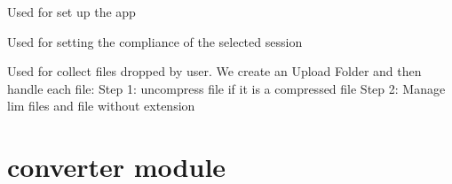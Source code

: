 \documentclass[letterpaper,10pt,english]{sphinxmanual}
\begin{document}

\begin{fulllineitems}
\label{\detokenize{app:app.serve}}
\pysigstartsignatures
{}
\pysigstopsignatures
\sphinxAtStartPar
Used for set up the app

\end{fulllineitems}


\begin{fulllineitems}
\label{\detokenize{app:app.set_compl}}
\pysigstartsignatures
{}
\pysigstopsignatures
\sphinxAtStartPar
Used for setting the compliance of the selected session

\end{fulllineitems}


\begin{fulllineitems}
\label{\detokenize{app:app.upload}}
\pysigstartsignatures
{}
\pysigstopsignatures
\sphinxAtStartPar
Used for collect files dropped by user. We create an Upload Folder and then handle each file:
Step 1: uncompress file if it is a compressed file
Step 2: Manage lim files and file without extension

\end{fulllineitems}


\sphinxstepscope


\chapter{converter module}
\label{\detokenize{converter:module-converter}}\label{\detokenize{converter:converter-module}}\label{\detokenize{converter::doc}}
\end{document}
